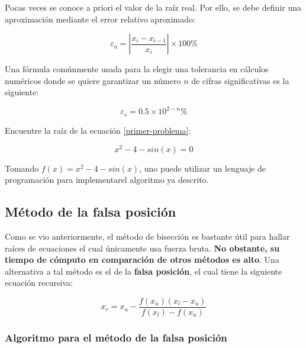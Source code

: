 Pocas veces se conoce a priori el valor de la raíz real. Por ello, se
debe definir una aproximación mediante el error relativo aproximado:

\[
	\varepsilon_a = \left| \frac{x_i - x_{i-1}}{x_i} \right| \times 100\%
\]

Una fórmula comúnmente usada para la elegir una tolerancia en cálculos numéricos
donde se quiere garantizar un número $n$ de cifras significativas es la
siguiente:

\[
	\varepsilon_s = 0.5 \times 10^{2-n} \%
\]

\begin{ex}

	Encuentre la raíz de la ecuación \ref{primer-problema}:

	\[
		x^2 - 4 - sin(x) = 0
	\]

	\begin{solution}
		Tomando $f(x) = x^2 - 4 - sin(x)$, uno puede utilizar un
		lenguaje de programación para implementarel algoritmo ya
		descrito.

		

		
	\end{solution}
	
\end{ex}

\subsection{Método de la falsa posición}

Como se vio anteriormente, el método de bisección es bastante útil para hallar
raíces de ecuaciones el cual únicamente usa fuerza bruta. \textbf{No obstante,
su tiempo de cómputo en comparación de otros métodos es alto}. Una alternativa a
tal método es el de la \textbf{falsa posición}, el cual tiene la siguiente ecuación
recursiva:

\[
	x_r = x_u - \frac{f(x_u) (x_l-x_u)}{f(x_l) - f(x_u)}
\]

\subsubsection{Algoritmo para el método de la falsa posición}

